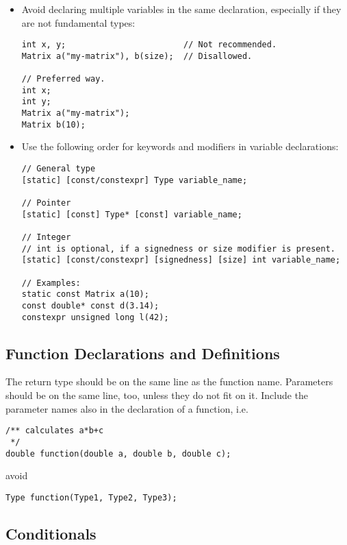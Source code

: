 \begin{itemize}
\item Avoid declaring multiple variables in the same declaration, especially if they are not fundamental types:

\begin{lstlisting}[showspaces=false]
int x, y;                        // Not recommended.
Matrix a("my-matrix"), b(size);  // Disallowed.

// Preferred way.
int x;
int y;
Matrix a("my-matrix");
Matrix b(10);
\end{lstlisting}

\item Use the following order for keywords and modifiers in  variable declarations:

\begin{lstlisting}[showspaces=false]
// General type
[static] [const/constexpr] Type variable_name;

// Pointer
[static] [const] Type* [const] variable_name;

// Integer
// int is optional, if a signedness or size modifier is present.
[static] [const/constexpr] [signedness] [size] int variable_name;

// Examples:
static const Matrix a(10);
const double* const d(3.14);
constexpr unsigned long l(42);
\end{lstlisting}

\end{itemize}

\subsection{Function Declarations and Definitions}

The return type should be on the same line as the function name.
Parameters should be on the same line, too, unless they do not fit on it.
Include the parameter names also in the declaration of a function, i.e.
\begin{lstlisting}
/** calculates a*b+c
 */
double function(double a, double b, double c);
\end{lstlisting}
avoid
\begin{lstlisting}
Type function(Type1, Type2, Type3);
\end{lstlisting}

\subsection{Conditionals}

